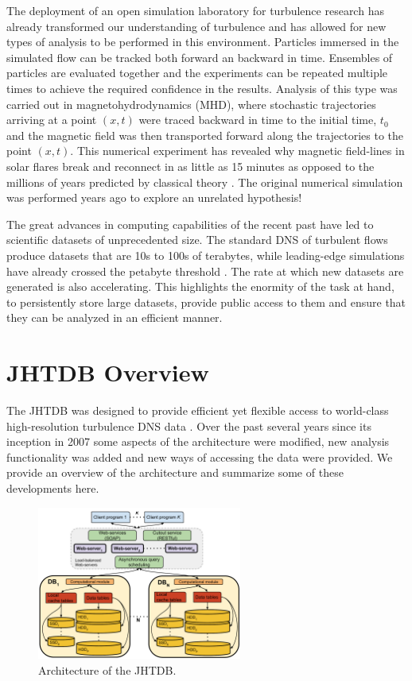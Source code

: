 \documentclass[10pt,twocolumn]{article}
\begin{document}
The deployment of an open simulation laboratory for turbulence research has already transformed our understanding of turbulence and has allowed for new
types of analysis to be performed in this environment. Particles immersed in the simulated flow can be tracked both forward an backward in time. 
Ensembles of particles are evaluated together and the experiments can be repeated multiple times to achieve the required confidence in the results.
Analysis of this type was carried out in magnetohydrodynamics (MHD), where stochastic trajectories arriving at a point $(x, t)$ were traced backward in 
time to the initial time, $t_0$ and the magnetic field was then transported forward along the trajectories to the point $(x, t)$. This numerical experiment has
revealed why magnetic field-lines in solar flares break and reconnect in as little as 15 minutes as opposed to the millions of years predicted by classical 
theory \cite{Eyink}. {\color{red}The original numerical simulation was performed years ago to explore an unrelated hypothesis!}

The great advances in computing capabilities of the recent past have led to scientific datasets of unprecedented size. The standard DNS of turbulent flows
produce datasets that are 10s to 100s of terabytes, while leading-edge simulations have already crossed the petabyte threshold \cite{Lee}. The rate at
which new datasets are generated is also accelerating. This highlights the enormity of the task at hand, to persistently store large datasets, provide public access
to them and ensure that they can be analyzed in an efficient manner. 

\section{JHTDB Overview}

The JHTDB was designed to provide efficient yet flexible access to world-class high-resolution turbulence DNS data \cite{Yi, Perlman}. Over the past
several years since its inception in 2007 some aspects of the architecture were modified, new analysis functionality was added and new ways of accessing
the data were provided. We provide an overview of the architecture and summarize some of these developments here.

\begin{figure}
\includegraphics[width=0.6\textwidth]{jhtdb_diagram.pdf}
\caption{Architecture of the JHTDB.}
\label{fig:architecture}
\end{figure}
\end{document}
